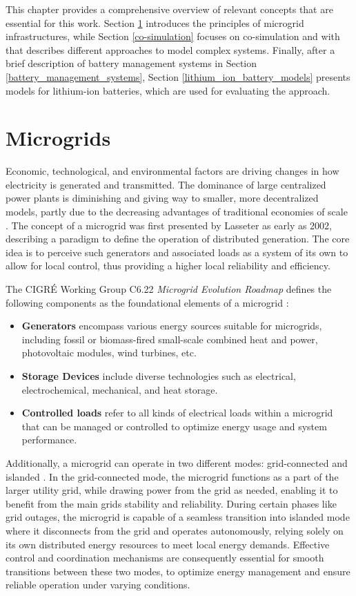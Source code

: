 This chapter provides a comprehensive overview of relevant concepts that are essential for this work. Section \ref{microgrids} introduces the principles of microgrid infrastructures, while Section \ref{co-simulation} focuses on co-simulation and with that describes different approaches to model complex systems. Finally, after a brief description of battery management systems in Section \ref{battery_management_systems}, Section \ref{lithium_ion_battery_models} presents models for lithium-ion batteries, which are used for evaluating the approach.

\section{Microgrids}
\label{microgrids}
Economic, technological, and environmental factors are driving changes in how electricity is generated and transmitted. The dominance of large centralized power plants is diminishing and giving way to smaller, more decentralized models, partly due to the decreasing advantages of traditional economies of scale \cite{MicrogridConcept}. The concept of a microgrid was first presented by Lasseter \cite{Microgrid} as early as 2002, describing a paradigm to define the operation of distributed generation. The core idea is to perceive such generators and associated loads as a system of its own to allow for local control, thus providing a higher local reliability and efficiency.

The CIGRÉ Working Group C6.22 \textit{Microgrid Evolution Roadmap}  defines the following components as the foundational elements of a microgrid \cite{MicrogridKeyComponents}:
\begin{itemize}
    \item[] \textbf{Generators} encompass various energy sources suitable for microgrids, including fossil or biomass-fired small-scale combined heat and power, photovoltaic modules, wind turbines, etc.
    \item[] \textbf{Storage Devices} include diverse technologies such as electrical, electrochemical, mechanical, and heat storage.
    \item[] \textbf{Controlled loads} refer to all kinds of electrical loads within a microgrid that can be managed or controlled to optimize energy usage and system performance.
\end{itemize}

Additionally, a microgrid can operate in two different modes: grid-connected and islanded \cite{MicrogridConcept, MicrogridKeyComponents, MicrogridComprehensiveStudy}. In the grid-connected mode, the microgrid functions as a part of the larger utility grid, while drawing power from the grid as needed, enabling it to benefit from the main grids stability and reliability. During certain phases like grid outages, the microgrid is capable of a seamless transition into islanded mode where it disconnects from the grid and operates autonomously, relying solely on its own distributed energy resources to meet local energy demands. Effective control and coordination mechanisms are consequently essential for smooth transitions between these two modes, to optimize energy management and ensure reliable operation under varying conditions.

